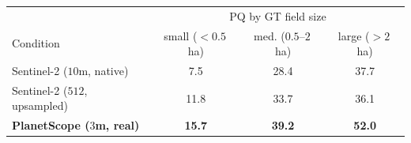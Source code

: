 \footnotesize
\setlength{\tabcolsep}{5pt}
\begin{tabular}{@{}lccc@{}}
\toprule
 & \multicolumn{3}{c}{PQ by GT field size} \\
\cmidrule(lr){2-4}
Condition & \makecell{small\\($<0.5$\,ha)} & \makecell{med.\\($0.5$--$2$\,ha)} & \makecell{large\\($>2$\,ha)} \\
\midrule
Sentinel-2 ($10$m, native) & 7.5 & 28.4 & 37.7 \\
Sentinel-2 ($512$, upsampled) & 11.8 & 33.7 & 36.1 \\
\textbf{PlanetScope ($3$m, real)} & \textbf{15.7} & \textbf{39.2} & \textbf{52.0} \\
\bottomrule
\end{tabular}

